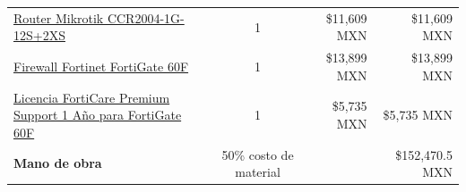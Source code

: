 \begin{longtable}{p{6cm}crr}
    \href{https://www.amazon.com.mx/Mikrotik-Router-Ethernet-CCR2004-1G-12S-2XS/dp/B087X9QKGH}{Router Mikrotik CCR2004-1G-12S+2XS} & 1 & \$11,609 MXN & \$11,609 MXN\\
      \href{https://www.cyberpuerta.mx/Computo-Hardware/Redes/Firewall/Firewall-Fortinet-60F-Alambrico-Inalambrico-5-x-RJ-45-10000-Mbit-s.html}{Firewall Fortinet FortiGate 60F} & 1 & \$13,899 MXN & \$13,899 MXN\\
      \href{https://www.router-switch.com/es/fc-10-0060f-950-02-12.html}{Licencia FortiCare Premium Support 1 Año para FortiGate 60F} & 1 & \$5,735 MXN & \$5,735 MXN\\
      \textbf{Mano de obra} & 50\% costo de material & & \$152,470.5 MXN\\
\end{longtable}
